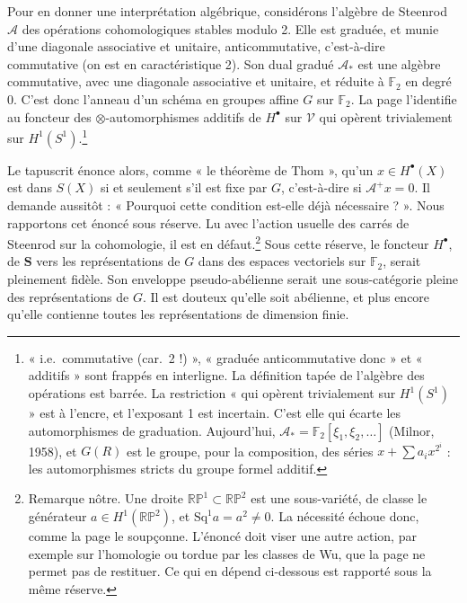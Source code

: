 \documentclass[11pt,a4paper]{article}
\begin{document}
Pour en donner une interprétation algébrique, considérons l'algèbre de
Steenrod $\mathcal{A}$ des opérations cohomologiques stables modulo 2. Elle est
graduée, et munie d'une diagonale associative et unitaire, anticommutative,
c'est-à-dire commutative (on est en caractéristique 2). Son dual gradué
$\mathcal{A}_*$ est une algèbre commutative, avec une diagonale associative et
unitaire, et réduite à $\mathbb{F}_2$ en degré 0. C'est donc l'anneau d'un
schéma en groupes affine $G$ sur $\mathbb{F}_2$. La page l'identifie au foncteur
des $\otimes$-automorphismes additifs de $H^{\bullet}$ sur $\mathcal{V}$ qui
opèrent trivialement sur $H^{1}(S^{1})$.\footnote{« i.e.\ commutative (car.\ 2
!) », « graduée anticommutative donc » et « additifs » sont frappés en
interligne. La définition tapée de l'algèbre des opérations est barrée. La
restriction « qui opèrent trivialement sur $H^{1}(S^{1})$ » est à l'encre, et
l'exposant 1 est incertain. C'est elle qui écarte les automorphismes de
graduation. Aujourd'hui, $\mathcal{A}_* = \mathbb{F}_2[\xi_1, \xi_2, \ldots]$
(Milnor, 1958), et $G(R)$ est le groupe, pour la composition, des séries $x +
\sum a_i x^{2^{i}}$ : les automorphismes stricts du groupe formel additif.}

Le tapuscrit énonce alors, comme « le théorème de Thom », qu'un $x \in
H^{\bullet}(X)$ est dans $S(X)$ si et seulement s'il est fixe par $G$,
c'est-à-dire si $\mathcal{A}^{+} x = 0$. Il demande aussitôt : « Pourquoi cette
condition est-elle déjà nécessaire ? ». Nous rapportons cet énoncé sous réserve.
Lu avec l'action usuelle des carrés de Steenrod sur la cohomologie, il est en
défaut.\footnote{Remarque nôtre. Une droite $\mathbb{RP}^{1} \subset
\mathbb{RP}^{2}$ est une sous-variété, de classe le générateur $a \in
H^{1}(\mathbb{RP}^{2})$, et $\mathrm{Sq}^{1}a = a^{2} \neq 0$. La nécessité
échoue donc, comme la page le soupçonne. L'énoncé doit viser une autre action,
par exemple sur l'homologie ou tordue par les classes de Wu, que la page ne
permet pas de restituer. Ce qui en dépend ci-dessous est rapporté sous la
même réserve.} Sous cette réserve, le foncteur $H^{\bullet}$, de
$\mathbf{S}$ vers les représentations de $G$ dans des espaces vectoriels sur
$\mathbb{F}_2$, serait pleinement fidèle. Son enveloppe pseudo-abélienne
serait une sous-catégorie pleine des représentations de $G$. Il est douteux
qu'elle soit abélienne, et plus encore qu'elle contienne toutes les
représentations de dimension finie.
\end{document}
